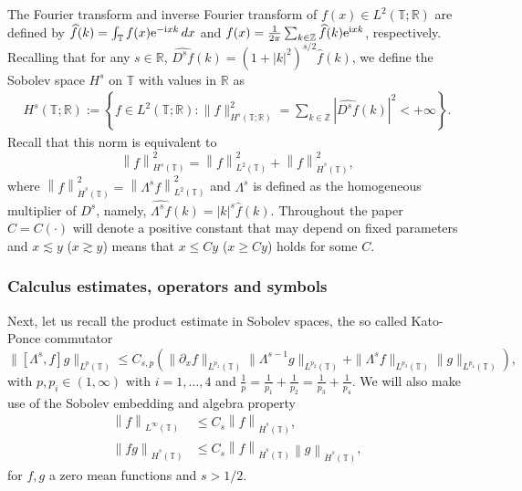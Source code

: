 \documentclass[reqno]{amsart}
\newcommand{\RR}{\mathbb R}
\newcommand{\TT}{\mathbb T}
\newcommand{\pa}{\partial}
\newcommand{\norm}[1]{\left\lVert#1\right\rVert}
\theoremstyle{definition}
\numberwithin{equation}{section}
\numberwithin{theorem}{section}
\numberwithin{definition}{section}
\begin{document}
	The Fourier
	transform and inverse Fourier transform of $f(x)\in L^2(\TT;\RR)$ are defined by
	$\widehat{f}(k)=\int_{\TT}f(x){\rm e}^{-{\rm i}x k}\, dx$ and 
	$f(x)=\frac{1}{2\pi}\sum_{k\in\mathbb Z}\widehat{f}(k){\rm e}^{{\rm i}x k}$, respectively. Recalling that for any $s\in\RR$,  
	$\widehat{D^{s} f}(k)=(1+|k|^2)^{s/2}\widehat{f}(k)$, we define the Sobolev space $H^s$ on $\TT$ with values in $\RR$ as
	\begin{align*}
	H^s(\TT;\RR):=\left\{f\in L^2(\TT;\RR):\|f\|_{H^s(\TT;\RR)}^2
	=\sum_{k\in\mathbb Z}|\widehat{D^sf}(k)|^2<+\infty\right\}.
	\end{align*}
	Recall that this norm is equivalent to 
	\[ \norm{f}^{2}_{H^{s}(\TT)}= \norm{f}_{L^{2}(\TT)}^{2}+\norm{f}_{\dot{H}^{s}(\TT)}^{2},\]	
	where $\norm{f}_{\dot{H}^{s}(\TT)}^{2}=\norm{\Lambda^{s}f}_{L^{2}(\TT)}^{2}$ and $\Lambda^{s}$ is defined as the homogeneous multiplier of $D^{s}$, namely, $\widehat{\Lambda^{s} f}(k)=|k|^{s}\widehat{f}(k)$.  Throughout the paper $C = C(\cdot)$ will denote a positive constant that may depend on fixed parameters  and  $x \lesssim y$ ($x \gtrsim y$) means that $x\le C y$ ($x\ge C y$) holds for some $C$. 
	
	
	
	
	
\subsubsection*{Calculus estimates, operators and symbols}
	Next, let us recall the product estimate in Sobolev spaces, the so called Kato-Ponce commutator  \cite{Kato-Ponce-1988-CPAM, Kenig-Ponce-Vega-1991-JAMS}
	\begin{equation}\label{KPcom}
	\|\left[\Lambda^s,f\right]g\|_{L^p(\TT)}\leq C_{s,p}(\|\pa_{x} f\|_{L^{p_1}(\TT)}\|\Lambda^{s-1}g\|_{L^{p_2}(\TT)}+\|\Lambda^sf\|_{L^{p_3}(\TT)}\|g\|_{L^{p_4}(\TT)}),
	\end{equation}
	with $p,p_i\in(1,\infty)$ with $i=1,\ldots,4$ and $\frac{1}{p}=\frac{1}{p_1}+\frac{1}{p_2}=\frac{1}{p_3}+\frac{1}{p_4}$. We will also make use of the Sobolev embedding and algebra property
		\begin{align}
		\norm{f}_{L^{\infty}(\TT)}&\leq C_{s} \norm{f}_{\dot{H}^{s}(\TT)}, \label{Sob:e} \\
		\norm{fg}_{\dot{H}^{s}(\TT)}&\leq C_{s} \norm{f}_{\dot{H}^{s}(\TT)}\norm{g}_{\dot{H}^{s}(\TT)}, \label{Alg:pro}
		\end{align}
	for $f,g $ a zero mean functions and $s>1/2$. \medskip
	
\end{document}
